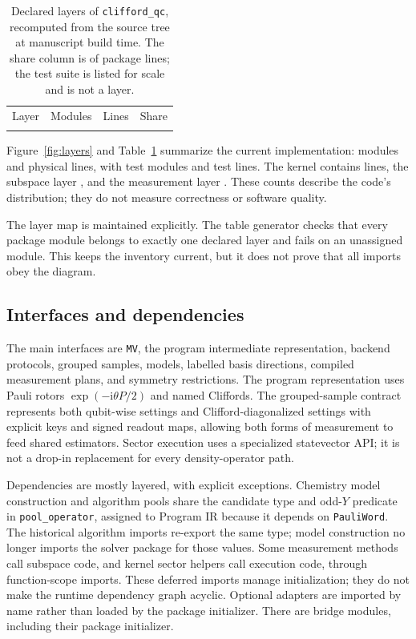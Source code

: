 \documentclass[aps,pra,reprint,superscriptaddress,nofootinbib,floatfix,
  showkeys]{revtex4-2}
\newcommand{\pkg}{\texttt{clifford\_qc}}
\begin{document}
\begin{table}
  \caption{Declared layers of \pkg{}, recomputed from the source tree at
  manuscript build time.  The share column is of package lines; the test suite
  is listed for scale and is not a layer.}
  \label{tab:layers}
  \begin{ruledtabular}
  \begin{tabular}{lrrr}
  Layer & Modules & Lines & Share \\
  \colrule
  
  \end{tabular}
  \end{ruledtabular}
\end{table}

Figure~\ref{fig:layers} and Table~\ref{tab:layers} summarize the current
implementation: \cqcModules{} modules and \cqcLines{} physical lines, with
\cqcTestModules{} test modules and \cqcTestLines{} test lines. The kernel
contains \cqcKernelLines{} lines, the subspace layer \cqcSubspaceLines{}, and
the measurement layer \cqcMeasurementLines{}. These counts describe the code's
distribution; they do not measure correctness or software quality.

The layer map is maintained explicitly. The table generator checks that every
package module belongs to exactly one declared layer and fails on an unassigned
module. This keeps the inventory current, but it does not prove that all imports
obey the diagram.

\subsection{Interfaces and dependencies}

The main interfaces are \texttt{MV}, the program intermediate representation,
backend protocols, grouped samples, models, labelled basis directions, compiled
measurement plans, and symmetry restrictions. The program representation uses
Pauli rotors $\exp(-\mathrm{i}\theta P/2)$ and named Cliffords. The grouped-sample
contract represents both qubit-wise settings and Clifford-diagonalized settings
with explicit keys and signed readout maps, allowing both forms of measurement
to feed shared estimators. Sector execution uses a specialized statevector API;
it is not a drop-in replacement for every density-operator path.

Dependencies are mostly layered, with explicit exceptions. Chemistry model
construction and algorithm pools share the candidate type and odd-$Y$ predicate
in \texttt{pool\_operator}, assigned to Program IR because it depends on
\texttt{PauliWord}. The historical algorithm imports re-export the same type;
model construction no longer imports the solver package for those values. Some measurement
methods call subspace code, and kernel sector helpers call execution code,
through function-scope imports. These deferred imports manage initialization;
they do not make the runtime dependency graph acyclic. Optional adapters are
imported by name rather than loaded by the package initializer. There are
\cqcBridgeModules{} bridge modules, including their package initializer.
\end{document}
